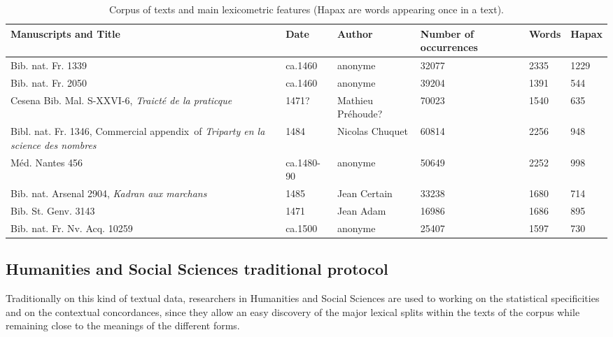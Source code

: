 \documentclass[preprint]{elsarticle}
\begin{document}
\begin{table}
\begin{center}
\begin{small}
\setlength{\tabcolsep}{4pt}
\renewcommand{\arraystretch}{1.2}
\begin{tabular}{|p{4cm}|p{1.5cm}|p{1.5cm}|p{1.8cm}|p{1.3cm}|p{1.3cm}|}
\hline
\textbf{Manuscripts} and \textbf{Title} &   \textbf{Date} & \textbf{Author}  & \textbf{Number of} \textbf{occurrences} & \textbf{Words} & \textbf{Hapax} \\\hline\hline
Bib. nat. Fr. 1339 & ca.1460 & anonyme & 32077 & 2335 & 1229 \\
Bib. nat. Fr. 2050 & ca.1460 & anonyme & 39204 & 1391 & 544 \\
Cesena Bib. Mal. S-XXVI-6, \textit{Traict\'e de la praticque}  & 1471? & Mathieu {Pr\'ehoude}? & 70023 & 1540 & 635 \\
Bibl. nat. Fr. 1346, Commercial appendix~of \textit{Triparty en la science des nombres} & 1484		& Nicolas Chuquet & 60814 & 2256 & 948 \\ 
M\'ed. Nantes 456   & ca.1480-90		& anonyme & 50649 & 2252 & 998\\
Bib. nat. Arsenal 2904, \textit{Kadran aux marchans} & 1485 & Jean Certain & 33238 &1680 &714 \\ 
Bib. St. Genv. 3143 & 1471 & Jean Adam & 16986 & 1686 & 895\\
Bib. nat. Fr. Nv. Acq. 10259 & ca.1500 & anonyme & 25407 & 1597  &730 \\
\hline
\end{tabular}
\end{small}
\end{center}
\caption{Corpus of texts and main lexicometric features (Hapax are words appearing once in a text).}
\label{tab:chronomss}
\end{table}
\subsection{Humanities and Social Sciences traditional protocol}

Traditionally on this kind of textual data, researchers in Humanities and Social Sciences are used to working on the statistical specificities and on the contextual concordances, since they allow an easy discovery of the major lexical splits within the texts of the corpus while remaining close to the meanings of the different forms.\\
\end{document}
